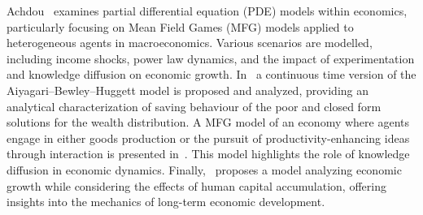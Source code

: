 Achdou~\cite{achdou2014partial} examines partial differential equation (PDE) models within economics, particularly focusing on Mean Field Games (MFG) models applied to heterogeneous agents in macroeconomics.
Various scenarios are modelled, including income shocks, power law dynamics, and the impact of experimentation and knowledge diffusion on economic growth. 
In~\cite{achdou2022income} a continuous time version of the Aiyagari–Bewley–Huggett model is proposed and analyzed, providing an analytical characterization of saving behaviour of the poor and closed form solutions for the wealth distribution.
A MFG model of an economy where agents engage in either goods production or the pursuit of productivity-enhancing ideas through interaction is presented in~\cite{lucas2014knowledge}. This model highlights the role of knowledge diffusion in economic dynamics.
Finally,~\cite{lucas1988mechanics} proposes a model analyzing economic growth while considering the effects of human capital accumulation, offering insights into the mechanics of long-term economic development. 